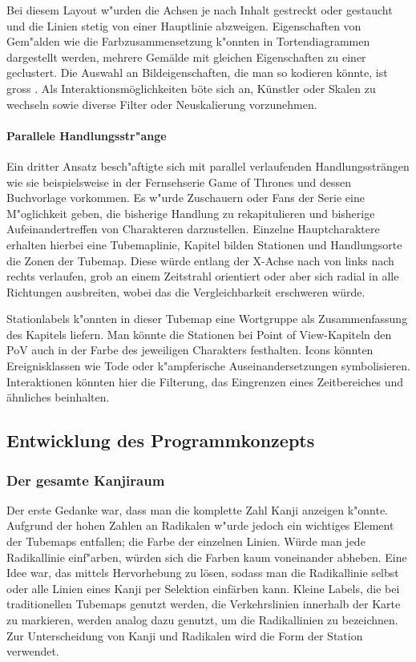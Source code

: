 Bei diesem Layout w"urden die Achsen je nach Inhalt gestreckt oder gestaucht und die Linien stetig von einer Hauptlinie abzweigen. Eigenschaften von Gem"alden wie die Farbzusammensetzung k"onnten in Tortendiagrammen dargestellt werden, mehrere Gemälde mit gleichen Eigenschaften zu einer geclustert. Die Auswahl an Bildeigenschaften, die man so kodieren könnte, ist gross . Als Interaktionsmöglichkeiten böte sich an, Künstler oder Skalen zu wechseln sowie diverse Filter oder Neuskalierung vorzunehmen. 

\paragraph{Parallele Handlungsstr"ange}
Ein dritter Ansatz besch"aftigte sich mit parallel verlaufenden Handlungssträngen wie sie beispielsweise in der Fernsehserie Game of Thrones und dessen Buchvorlage vorkommen. Es w"urde Zuschauern oder Fans der Serie eine M"oglichkeit geben, die bisherige Handlung zu rekapitulieren und bisherige Aufeinandertreffen von Charakteren darzustellen. Einzelne Hauptcharaktere erhalten hierbei eine Tubemaplinie, Kapitel bilden Stationen und Handlungsorte die Zonen der Tubemap. Diese würde entlang der X-Achse nach von links nach rechts verlaufen, grob an einem Zeitstrahl orientiert oder aber sich radial in alle Richtungen ausbreiten, wobei das die Vergleichbarkeit erschweren würde.

Stationlabels k"onnten in dieser Tubemap eine Wortgruppe als Zusammenfassung des Kapitels liefern. Man könnte die Stationen bei Point of View-Kapiteln den PoV auch in der Farbe des jeweiligen Charakters festhalten. Icons könnten Ereignisklassen wie Tode oder k"ampferische Auseinandersetzungen symbolisieren. Interaktionen könnten hier die Filterung, das Eingrenzen eines Zeitbereiches und ähnliches beinhalten. 


\subsection{Entwicklung des Programmkonzepts}
\subsubsection{Der gesamte Kanjiraum}
Der erste Gedanke war, dass man die komplette Zahl Kanji anzeigen k"onnte. Aufgrund der hohen Zahlen an Radikalen w"urde jedoch ein wichtiges Element der Tubemaps entfallen; die Farbe der einzelnen Linien. Würde man jede Radikallinie einf"arben, würden sich die Farben kaum voneinander abheben. Eine Idee war, das mittels Hervorhebung zu lösen, sodass man die Radikallinie selbst oder alle Linien eines Kanji per Selektion einfärben kann. Kleine Labels, die bei traditionellen Tubemaps genutzt werden, die Verkehrslinien innerhalb der Karte zu markieren, werden analog dazu genutzt, um die Radikallinien zu bezeichnen. Zur Unterscheidung von Kanji und Radikalen wird die Form der Station verwendet.

